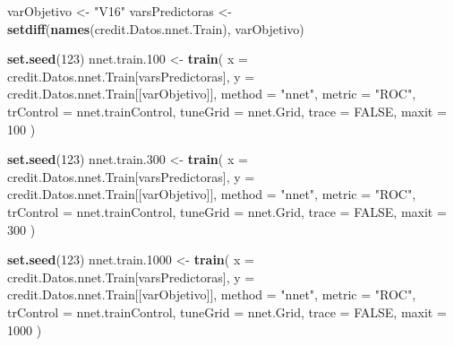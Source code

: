 \documentclass[
]{article}
\newenvironment{Shaded}{\begin{snugshade}}{\end{snugshade}}
\newcommand{\AttributeTok}[1]{\textcolor[rgb]{0.13,0.29,0.53}{#1}}
\newcommand{\ConstantTok}[1]{\textcolor[rgb]{0.56,0.35,0.01}{#1}}
\newcommand{\DecValTok}[1]{\textcolor[rgb]{0.00,0.00,0.81}{#1}}
\newcommand{\FloatTok}[1]{\textcolor[rgb]{0.00,0.00,0.81}{#1}}
\newcommand{\FunctionTok}[1]{\textcolor[rgb]{0.13,0.29,0.53}{\textbf{#1}}}
\newcommand{\NormalTok}[1]{#1}
\newcommand{\OtherTok}[1]{\textcolor[rgb]{0.56,0.35,0.01}{#1}}
\newcommand{\StringTok}[1]{\textcolor[rgb]{0.31,0.60,0.02}{#1}}
\begin{document}
\begin{Shaded}
\begin{Highlighting}[]
\NormalTok{varObjetivo }\OtherTok{\textless{}{-}} \StringTok{"V16"}
\NormalTok{varsPredictoras }\OtherTok{\textless{}{-}} \FunctionTok{setdiff}\NormalTok{(}\FunctionTok{names}\NormalTok{(credit.Datos.nnet.Train), varObjetivo)}
\end{Highlighting}
\end{Shaded}

\begin{Shaded}
\begin{Highlighting}[]
\FunctionTok{set.seed}\NormalTok{(}\DecValTok{123}\NormalTok{)}
\NormalTok{nnet.train}\FloatTok{.100} \OtherTok{\textless{}{-}} \FunctionTok{train}\NormalTok{(}
  \AttributeTok{x =}\NormalTok{ credit.Datos.nnet.Train[varsPredictoras],}
  \AttributeTok{y =}\NormalTok{ credit.Datos.nnet.Train[[varObjetivo]],}
  \AttributeTok{method =} \StringTok{"nnet"}\NormalTok{,}
  \AttributeTok{metric =} \StringTok{"ROC"}\NormalTok{,}
  \AttributeTok{trControl =}\NormalTok{ nnet.trainControl,}
  \AttributeTok{tuneGrid =}\NormalTok{ nnet.Grid,}
  \AttributeTok{trace =} \ConstantTok{FALSE}\NormalTok{,}
  \AttributeTok{maxit =} \DecValTok{100}
\NormalTok{)}

\FunctionTok{set.seed}\NormalTok{(}\DecValTok{123}\NormalTok{)}
\NormalTok{nnet.train}\FloatTok{.300} \OtherTok{\textless{}{-}} \FunctionTok{train}\NormalTok{(}
  \AttributeTok{x =}\NormalTok{ credit.Datos.nnet.Train[varsPredictoras],}
  \AttributeTok{y =}\NormalTok{ credit.Datos.nnet.Train[[varObjetivo]],}
  \AttributeTok{method =} \StringTok{"nnet"}\NormalTok{,}
  \AttributeTok{metric =} \StringTok{"ROC"}\NormalTok{,}
  \AttributeTok{trControl =}\NormalTok{ nnet.trainControl,}
  \AttributeTok{tuneGrid =}\NormalTok{ nnet.Grid,}
  \AttributeTok{trace =} \ConstantTok{FALSE}\NormalTok{,}
  \AttributeTok{maxit =} \DecValTok{300}
\NormalTok{)}

\FunctionTok{set.seed}\NormalTok{(}\DecValTok{123}\NormalTok{)}
\NormalTok{nnet.train}\FloatTok{.1000} \OtherTok{\textless{}{-}} \FunctionTok{train}\NormalTok{(}
  \AttributeTok{x =}\NormalTok{ credit.Datos.nnet.Train[varsPredictoras],}
  \AttributeTok{y =}\NormalTok{ credit.Datos.nnet.Train[[varObjetivo]],}
  \AttributeTok{method =} \StringTok{"nnet"}\NormalTok{,}
  \AttributeTok{metric =} \StringTok{"ROC"}\NormalTok{,}
  \AttributeTok{trControl =}\NormalTok{ nnet.trainControl,}
  \AttributeTok{tuneGrid =}\NormalTok{ nnet.Grid,}
  \AttributeTok{trace =} \ConstantTok{FALSE}\NormalTok{,}
  \AttributeTok{maxit =} \DecValTok{1000}
\NormalTok{)}
\end{Highlighting}
\end{Shaded}
\end{document}
